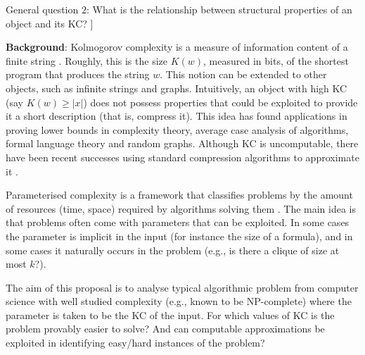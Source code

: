 \documentclass{article}
\theoremstyle{plain} \numberwithin{equation}{section}
\theoremstyle{definition}
\begin{document}
General question 2: What is the relationship between structural properties of an object and its KC? ]
\fi

\bigskip


\noindent
{\bf Background}: Kolmogorov complexity is a measure of information content of a finite string \cite{LiVi97}. Roughly, this is the size $K(w)$, measured in bits, of the shortest program that produces the string $w$. This notion can be extended to other objects, such as infinite strings and graphs. Intuitively, an object with high KC (say $K(w) \geq |x|$) does not possess properties that could be exploited to provide it a short description (that is, compress it). This idea has found applications in proving lower bounds in complexity theory, average case analysis of algorithms, formal language theory and random graphs. Although KC is uncomputable, there have been recent successes using standard compression algorithms to approximate it \cite{LCLMV03}.

\smallskip

Parameterised complexity is a framework that classifies problems by the amount of resources (time, space) required by algorithms solving them \cite{DoFe99}.
The main idea is that problems often come with parameters that can be exploited. In some cases the parameter is implicit in the input (for instance the size of a formula), and in some cases it naturally occurs in the problem (e.g., is there a clique of size at most $k$?).

\smallskip


The aim of this proposal is to analyse typical algorithmic problem from computer science with well studied complexity (e.g., known to be NP-complete) where the parameter is taken to be the KC of the input. For which values of KC is the problem provably easier to solve? And can computable approximations be exploited in identifying easy/hard instances of the problem?
\end{document}

